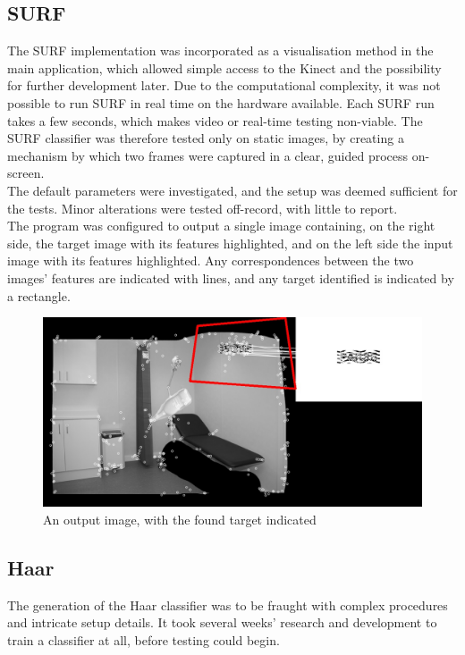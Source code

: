 \subsection{SURF}
The SURF implementation was incorporated as a visualisation method in the main application, which allowed simple access to the Kinect and the possibility for further development later. Due to the computational complexity, it was not possible to run SURF in real time on the hardware available. Each SURF run takes a few seconds, which makes video or real-time testing non-viable. The SURF classifier was therefore tested only on static images, by creating a mechanism by which two frames were captured in a clear, guided process on-screen.\\

The default parameters were investigated, and the setup was deemed sufficient for the tests. Minor alterations were tested off-record, with little to report. \\

The program was configured to output a single image containing, on the right side, the target image with its features highlighted, and on the left side the input image with its features highlighted. Any correspondences between the two images' features are indicated with lines, and any target identified is indicated by a rectangle.\\

\begin{figure}
\begin{center}
\includegraphics[scale=0.25]{zscreenshots/SURF-Example.jpg}
\caption{An output image, with the found target indicated}
\end{center}
\end{figure}

\subsection{Haar}
The generation of the Haar classifier was to be fraught with complex procedures and intricate setup details. It took several weeks’ research and development to train a classifier at all, before testing could begin.\\

